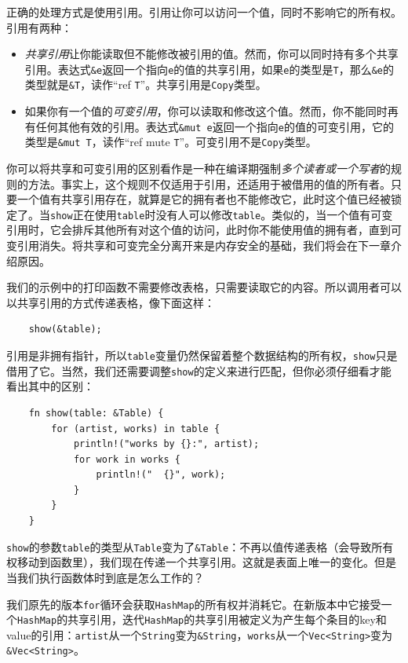 正确的处理方式是使用引用。引用让你可以访问一个值，同时不影响它的所有权。引用有两种：
\begin{itemize}
    \item \emph{共享引用}让你能读取但不能修改被引用的值。然而，你可以同时持有多个共享引用。表达式\texttt{\&e}返回一个指向\texttt{e}的值的共享引用，如果\texttt{e}的类型是\texttt{T}，那么\texttt{\&e}的类型就是\texttt{\&T}，读作“ref \texttt{T}”。共享引用是\texttt{Copy}类型。
    \item 如果你有一个值的\emph{可变引用}，你可以读取和修改这个值。然而，你不能同时再有任何其他有效的引用。表达式\texttt{\&mut e}返回一个指向\texttt{e}的值的可变引用，它的类型是\texttt{\&mut T}，读作“ref mute \texttt{T}”。可变引用不是\texttt{Copy}类型。
\end{itemize}

你可以将共享和可变引用的区别看作是一种在编译期强制\emph{多个读者或一个写者}的规则的方法。事实上，这个规则不仅适用于引用，还适用于被借用的值的所有者。只要一个值有共享引用存在，就算是它的拥有者也不能修改它，此时这个值已经被锁定了。当\texttt{show}正在使用\texttt{table}时没有人可以修改\texttt{table}。类似的，当一个值有可变引用时，它会排斥其他所有对这个值的访问，此时你不能使用值的拥有者，直到可变引用消失。将共享和可变完全分离开来是内存安全的基础，我们将会在下一章介绍原因。

我们的示例中的打印函数不需要修改表格，只需要读取它的内容。所以调用者可以以共享引用的方式传递表格，像下面这样：
\begin{verbatim}
    show(&table);
\end{verbatim}

引用是非拥有指针，所以\texttt{table}变量仍然保留着整个数据结构的所有权，\texttt{show}只是借用了它。当然，我们还需要调整\texttt{show}的定义来进行匹配，但你必须仔细看才能看出其中的区别：

\begin{verbatim}
    fn show(table: &Table) {
        for (artist, works) in table {
            println!("works by {}:", artist);
            for work in works {
                println!("  {}", work);
            }
        }
    }
\end{verbatim}

\texttt{show}的参数\texttt{table}的类型从\texttt{Table}变为了\texttt{\&Table}：不再以值传递表格（会导致所有权移动到函数里），我们现在传递一个共享引用。这就是表面上唯一的变化。但是当我们执行函数体时到底是怎么工作的？

我们原先的版本\texttt{for}循环会获取\texttt{HashMap}的所有权并消耗它。在新版本中它接受一个\texttt{HashMap}的共享引用，迭代\texttt{HashMap}的共享引用被定义为产生每个条目的key和value的引用：\texttt{artist}从一个\texttt{String}变为\texttt{\&String}，\texttt{works}从一个\texttt{Vec<String>}变为\texttt{\&Vec<String>}。


